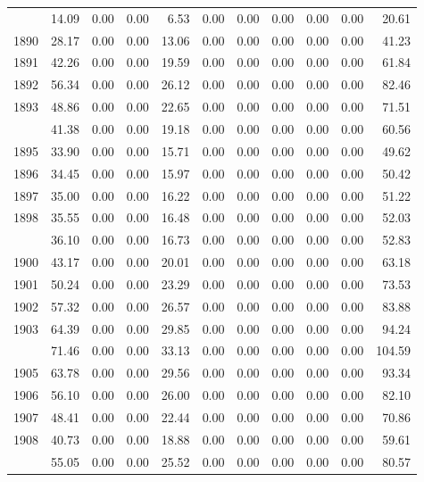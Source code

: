 \begin{longtable}[t]{rrrrrrrrrrr}
\endfoot
\bottomrule
\endlastfoot
1889 & 14.09 & 0.00 & 0.00 & 6.53 & 0.00 & 0.00 & 0.00 & 0.00 & 0.00 & 20.61\\
1890 & 28.17 & 0.00 & 0.00 & 13.06 & 0.00 & 0.00 & 0.00 & 0.00 & 0.00 & 41.23\\
1891 & 42.26 & 0.00 & 0.00 & 19.59 & 0.00 & 0.00 & 0.00 & 0.00 & 0.00 & 61.84\\
1892 & 56.34 & 0.00 & 0.00 & 26.12 & 0.00 & 0.00 & 0.00 & 0.00 & 0.00 & 82.46\\
1893 & 48.86 & 0.00 & 0.00 & 22.65 & 0.00 & 0.00 & 0.00 & 0.00 & 0.00 & 71.51\\
\addlinespace
1894 & 41.38 & 0.00 & 0.00 & 19.18 & 0.00 & 0.00 & 0.00 & 0.00 & 0.00 & 60.56\\
1895 & 33.90 & 0.00 & 0.00 & 15.71 & 0.00 & 0.00 & 0.00 & 0.00 & 0.00 & 49.62\\
1896 & 34.45 & 0.00 & 0.00 & 15.97 & 0.00 & 0.00 & 0.00 & 0.00 & 0.00 & 50.42\\
1897 & 35.00 & 0.00 & 0.00 & 16.22 & 0.00 & 0.00 & 0.00 & 0.00 & 0.00 & 51.22\\
1898 & 35.55 & 0.00 & 0.00 & 16.48 & 0.00 & 0.00 & 0.00 & 0.00 & 0.00 & 52.03\\
\addlinespace
1899 & 36.10 & 0.00 & 0.00 & 16.73 & 0.00 & 0.00 & 0.00 & 0.00 & 0.00 & 52.83\\
1900 & 43.17 & 0.00 & 0.00 & 20.01 & 0.00 & 0.00 & 0.00 & 0.00 & 0.00 & 63.18\\
1901 & 50.24 & 0.00 & 0.00 & 23.29 & 0.00 & 0.00 & 0.00 & 0.00 & 0.00 & 73.53\\
1902 & 57.32 & 0.00 & 0.00 & 26.57 & 0.00 & 0.00 & 0.00 & 0.00 & 0.00 & 83.88\\
1903 & 64.39 & 0.00 & 0.00 & 29.85 & 0.00 & 0.00 & 0.00 & 0.00 & 0.00 & 94.24\\
\addlinespace
1904 & 71.46 & 0.00 & 0.00 & 33.13 & 0.00 & 0.00 & 0.00 & 0.00 & 0.00 & 104.59\\
1905 & 63.78 & 0.00 & 0.00 & 29.56 & 0.00 & 0.00 & 0.00 & 0.00 & 0.00 & 93.34\\
1906 & 56.10 & 0.00 & 0.00 & 26.00 & 0.00 & 0.00 & 0.00 & 0.00 & 0.00 & 82.10\\
1907 & 48.41 & 0.00 & 0.00 & 22.44 & 0.00 & 0.00 & 0.00 & 0.00 & 0.00 & 70.86\\
1908 & 40.73 & 0.00 & 0.00 & 18.88 & 0.00 & 0.00 & 0.00 & 0.00 & 0.00 & 59.61\\
\addlinespace
1909 & 55.05 & 0.00 & 0.00 & 25.52 & 0.00 & 0.00 & 0.00 & 0.00 & 0.00 & 80.57\\

\end{longtable}

